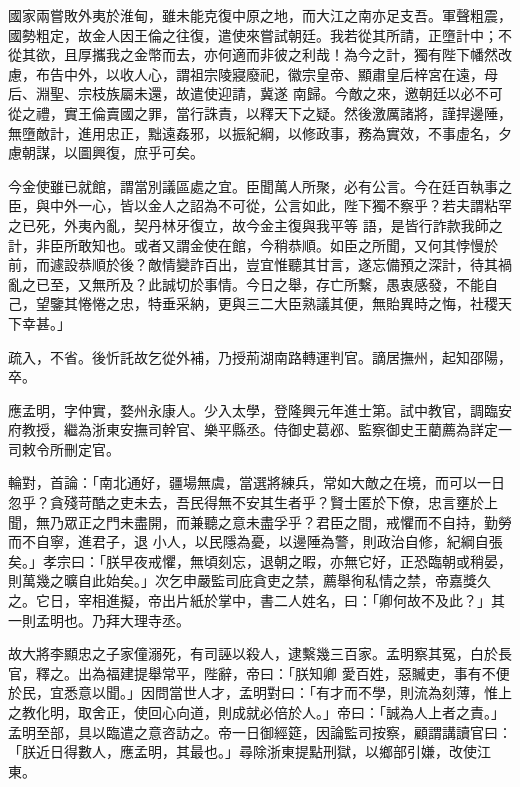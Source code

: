 \begin{pinyinscope}
 國家兩嘗敗外夷於淮甸，雖未能克復中原之地，而大江之南亦足支吾。軍聲粗震，國勢粗定，故金人因王倫之往復，遣使來嘗試朝廷。我若從其所請，正墮計中；不從其欲，且厚攜我之金幣而去，亦何適而非彼之利哉！為今之計，獨有陛下幡然改慮，布告中外，以收人心，謂祖宗陵寢廢祀，徽宗皇帝、顯肅皇后梓宮在遠，母后、淵聖、宗枝族屬未還，故遣使迎請，冀遂
 南歸。今敵之來，邀朝廷以必不可從之禮，實王倫賣國之罪，當行誅責，以釋天下之疑。然後激厲諸將，謹捍邊陲，無墮敵計，進用忠正，黜遠姦邪，以振紀綱，以修政事，務為實效，不事虛名，夕慮朝謀，以圖興復，庶乎可矣。



 今金使雖已就館，謂當別議區處之宜。臣聞萬人所聚，必有公言。今在廷百執事之臣，與中外一心，皆以金人之詔為不可從，公言如此，陛下獨不察乎？若夫謂粘罕之已死，外夷內亂，契丹林牙復立，故今金主復與我平等
 語，是皆行詐款我師之計，非臣所敢知也。或者又謂金使在館，今稍恭順。如臣之所聞，又何其悖慢於前，而遽設恭順於後？敵情變詐百出，豈宜惟聽其甘言，遂忘備預之深計，待其禍亂之已至，又無所及？此誠切於事情。今日之舉，存亡所繫，愚衷感發，不能自己，望鑒其惓惓之忠，特垂采納，更與三二大臣熟議其便，無貽異時之悔，社稷天下幸甚。」



 疏入，不省。後忻託故乞從外補，乃授荊湖南路轉運判官。謫居撫州，起知邵陽，卒。



 應孟明，字仲實，婺州永康人。少入太學，登隆興元年進士第。試中教官，調臨安府教授，繼為浙東安撫司幹官、樂平縣丞。侍御史葛邲、監察御史王藺薦為詳定一司敕令所刪定官。



 輪對，首論：「南北通好，疆場無虞，當選將練兵，常如大敵之在境，而可以一日忽乎？貪殘苛酷之吏未去，吾民得無不安其生者乎？賢士匿於下僚，忠言壅於上聞，無乃眾正之門未盡開，而兼聽之意未盡孚乎？君臣之間，戒懼而不自持，勤勞而不自寧，進君子，退
 小人，以民隱為憂，以邊陲為警，則政治自修，紀綱自張矣。」孝宗曰：「朕早夜戒懼，無頃刻忘，退朝之暇，亦無它好，正恐臨朝或稍晏，則萬幾之曠自此始矣。」次乞申嚴監司庇貪吏之禁，薦舉徇私情之禁，帝嘉獎久之。它日，宰相進擬，帝出片紙於掌中，書二人姓名，曰：「卿何故不及此？」其一則孟明也。乃拜大理寺丞。



 故大將李顯忠之子家僮溺死，有司誣以殺人，逮繫幾三百家。孟明察其冤，白於長官，釋之。出為福建提舉常平，陛辭，帝曰：「朕知卿
 愛百姓，惡贓吏，事有不便於民，宜悉意以聞。」因問當世人才，孟明對曰：「有才而不學，則流為刻薄，惟上之教化明，取舍正，使回心向道，則成就必倍於人。」帝曰：「誠為人上者之責。」孟明至部，具以臨遣之意咨訪之。帝一日御經筵，因論監司按察，顧謂講讀官曰：「朕近日得數人，應孟明，其最也。」尋除浙東提點刑獄，以鄉部引嫌，改使江東。




\end{pinyinscope}
